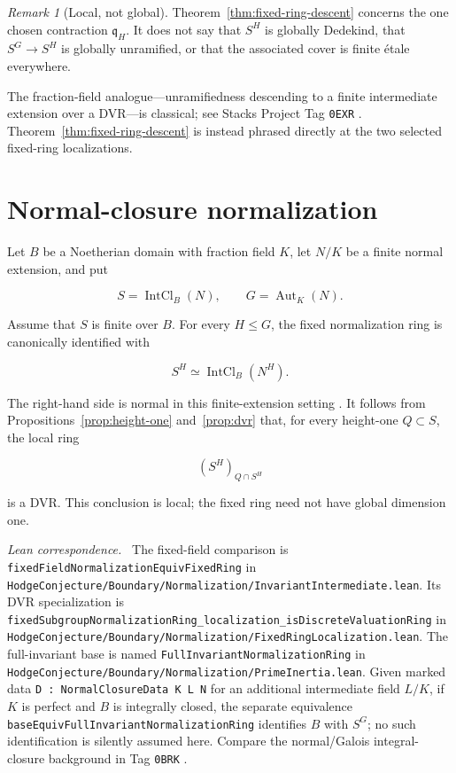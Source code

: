 \documentclass[11pt]{article}
\theoremstyle{remark}
\newtheorem*{remark}{Remark}
\DeclareMathOperator{\Aut}{Aut}
\newcommand{\q}{\mathfrak q}
\newcommand{\leanpath}[1]{\texttt{\nolinkurl{#1}}}
\newcommand{\leansrc}[1]{%
  \leanpath{HodgeConjecture/Boundary/Normalization/#1}}
\newenvironment{leanfiles}
  {\par\medskip\begingroup\footnotesize\raggedright\noindent
   \textit{Lean correspondence.}\ }
  {\par\endgroup\medskip}
\begin{document}
\begin{remark}[Local, not global]
Theorem~\ref{thm:fixed-ring-descent} concerns the one chosen contraction
\(\q_H\).  It does not say that \(S^H\) is globally Dedekind, that
\(S^G\to S^H\) is globally unramified, or that the associated cover is
finite \'etale everywhere.
\end{remark}

The fraction-field analogue---unramifiedness descending to a finite
intermediate extension over a DVR---is classical; see Stacks Project
Tag \texttt{0EXR} \cite{StacksUnramifiedSubextensions}.
Theorem~\ref{thm:fixed-ring-descent}
is instead phrased directly at the two selected fixed-ring localizations.

\section{Normal-closure normalization}
\label{sec:normalization}

Let \(B\) be a Noetherian domain with fraction field \(K\), let \(N/K\) be
a finite normal extension, and put

\[
  S=\operatorname{IntCl}_B(N),
  \qquad
  G=\Aut_K(N).
\]

Assume that \(S\) is finite over \(B\).  For every \(H\leq G\), the fixed
normalization ring is canonically identified with

\[
  S^H\simeq\operatorname{IntCl}_B(N^H).
\]

The right-hand side is normal in this finite-extension setting
\cite{StacksIntegralClosureNormal}.  It follows from
Propositions~\ref{prop:height-one} and~\ref{prop:dvr} that, for every
height-one \(Q\subset S\), the local ring

\[
  (S^H)_{Q\cap S^H}
\]

is a DVR\@.  This conclusion is local; the fixed ring need not have global
dimension one.

\begin{leanfiles}
The fixed-field comparison is
\leanpath{fixedFieldNormalizationEquivFixedRing} in
\leansrc{InvariantIntermediate.lean}.  Its DVR specialization is
\leanpath{fixedSubgroupNormalizationRing_localization_isDiscreteValuationRing}
in \leansrc{FixedRingLocalization.lean}.  The full-invariant base is named
\leanpath{FullInvariantNormalizationRing} in
\leansrc{PrimeInertia.lean}.  Given marked data
\leanpath{D : NormalClosureData K L N} for an additional intermediate field
\(L/K\), if \(K\) is perfect and \(B\) is integrally closed, the separate
equivalence
\leanpath{baseEquivFullInvariantNormalizationRing} identifies \(B\) with
\(S^G\); no such identification is silently assumed here.  Compare the
normal/Galois integral-closure background in Tag \texttt{0BRK}
\cite{StacksGaloisIntegralClosure}.
\end{leanfiles}
\end{document}
